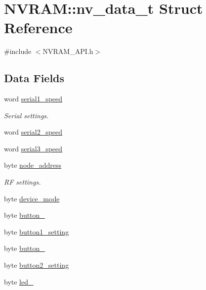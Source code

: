 \hypertarget{struct_n_v_r_a_m_1_1nv__data__t}{\section{N\-V\-R\-A\-M\-:\-:nv\-\_\-data\-\_\-t Struct Reference}
\label{struct_n_v_r_a_m_1_1nv__data__t}
}


{\ttfamily \#include $<$N\-V\-R\-A\-M\-\_\-\-A\-P\-I.\-h$>$}

\subsection*{Data Fields}
\begin{DoxyCompactItemize}
\item 
word \hyperlink{struct_n_v_r_a_m_1_1nv__data__t_abb123c8c889c02ac4029546337aa9fe2}{serial1\-\_\-speed}
\begin{DoxyCompactList}\small\item\em Serial settings. \end{DoxyCompactList}\item 
word \hyperlink{struct_n_v_r_a_m_1_1nv__data__t_a3be4f4188f49b382494b2992eb431101}{serial2\-\_\-speed}
\item 
word \hyperlink{struct_n_v_r_a_m_1_1nv__data__t_acd7027d3c02c1699cf6df2b9a5277414}{serial3\-\_\-speed}
\item 
byte \hyperlink{struct_n_v_r_a_m_1_1nv__data__t_af8f268b2dd52e9268d7ef9cca4cd6a46}{node\-\_\-address}
\begin{DoxyCompactList}\small\item\em R\-F settings. \end{DoxyCompactList}\item 
byte \hyperlink{struct_n_v_r_a_m_1_1nv__data__t_a33d231ebf8896a89fd566d162aaa6913}{device\-\_\-mode}
\item 
byte \hyperlink{struct_n_v_r_a_m_1_1nv__data__t_a36067ff177e63f1cdeedbd7cd53db951}{button\-\_}
\item 
byte \hyperlink{struct_n_v_r_a_m_1_1nv__data__t_a19c7c0d63ef3f54f87ef7c3bafe36fdf}{button1\-\_\-setting}
\item 
byte \hyperlink{struct_n_v_r_a_m_1_1nv__data__t_aa89f78239f7821922fbc829a5ead74c7}{button\-\_}
\item 
byte \hyperlink{struct_n_v_r_a_m_1_1nv__data__t_aec88de9d995c7a44eb4f79565c93a6be}{button2\-\_\-setting}
\item 
byte \hyperlink{struct_n_v_r_a_m_1_1nv__data__t_a3cc4dbc901e8c3659495774eaa851e63}{led\-\_}

\end{DoxyCompactItemize}
